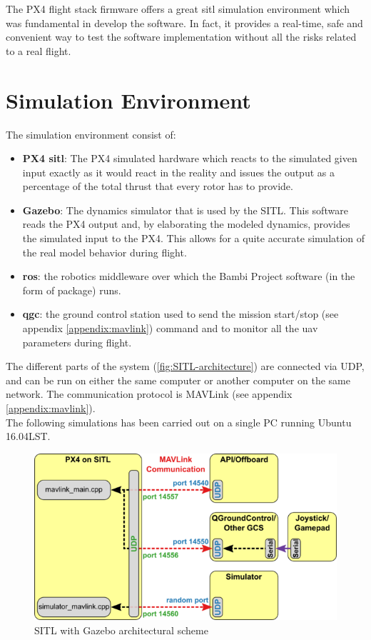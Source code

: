 The PX4 flight stack firmware offers a great \acrfull{sitl} simulation environment which was fundamental in develop the software. In fact, it provides a real-time, safe and convenient way to test the software implementation without all the risks related to a real flight. \\

\section{Simulation Environment} %
\label{sec:simulation_environment}
The simulation environment consist of:
\begin{itemize}
 	\item \textbf{PX4 \acrshort{sitl}}: The PX4 simulated hardware which reacts to the simulated given input exactly as it would react in the reality and issues the output as a percentage of the total thrust that every rotor has to provide.
 	\item \textbf{Gazebo}: The dynamics simulator that is used by the SITL. This software reads the PX4 output and, by elaborating the modeled dynamics, provides the simulated input to the PX4. This allows for a quite accurate simulation of the real model behavior during flight.
 	\item \textbf{\acrshort{ros}}: the robotics middleware over which the Bambi Project software (in the form of package) runs.
 	\item \textbf{\acrshort{qgc}}: the ground control station used to send the mission start/stop (see appendix \ref{appendix:mavlink}) command and to monitor all the \acrshort{uav} parameters during flight.
 \end{itemize}
 The different parts of the system (\autoref{fig:SITL-architecture}) are connected via UDP, and can be run on either the same computer or another computer on the same network. The communication protocol is MAVLink (see appendix \ref{appendix:mavlink}). \\
 The following simulations has been carried out on a single PC running Ubuntu 16.04LST.
 \begin{figure}[ht]
    \centering
    \includegraphics[width=.7\textwidth]{figures/C4/Px4_sitl_overview}
    \caption{SITL with Gazebo architectural scheme}
    \label{fig:SITL-architecture}
\end{figure}

